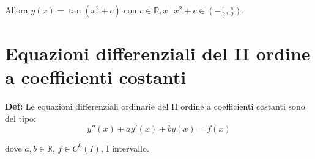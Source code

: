 \documentclass{article}
\begin{document}
\noindent Allora $y(x) = \tan(x^2 + c)$ con $c \in \mathbb{R}, x \ | \ x^2 + c \in \left(-\frac{\pi}{2}, \frac{\pi}{2}\right)$.

\section{Equazioni differenziali del II ordine a coefficienti costanti}
\textbf{Def:} Le equazioni differenziali ordinarie del II ordine a coefficienti costanti sono del tipo:
\begin{equation*}
    y''(x) + ay'(x) + by(x) = f(x)
\end{equation*}

\noindent dove $a, b \in \mathbb{R}$, $f \in C^0(I)$, I intervallo.
\end{document}
